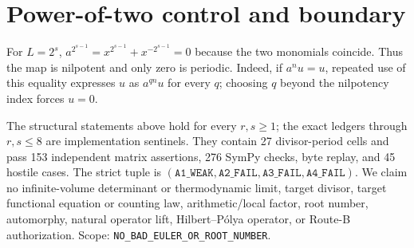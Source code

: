 \documentclass[10pt]{article}
\begin{document}
\section{Power-of-two control and boundary}
For $L=2^s$,
$a^{2^{s-1}}=x^{2^{s-1}}+x^{-2^{s-1}}=0$ because the two monomials coincide.
Thus the map is nilpotent and only zero is periodic.
Indeed, if $a^nu=u$, repeated use of this equality expresses $u$ as
$a^{qn}u$ for every $q$; choosing $q$ beyond the nilpotency index forces
$u=0$.

The structural statements above hold for every $r,s\geq1$; the exact ledgers
through $r,s\leq8$ are implementation sentinels.  They contain 27
divisor-period cells and pass 153 independent matrix assertions, 276
SymPy checks, byte replay, and 45 hostile cases.  The strict tuple is
$(\texttt{A1\_WEAK},\texttt{A2\_FAIL},\texttt{A3\_FAIL},
\texttt{A4\_FAIL})$.  We claim no infinite-volume determinant or
thermodynamic limit, target divisor, target functional equation or counting
law, arithmetic/local factor, root number, automorphy, natural operator lift,
Hilbert--P\'olya operator, or Route-B authorization.  Scope:
\texttt{NO\_BAD\_EULER\_OR\_ROOT\_NUMBER}.
\end{document}
